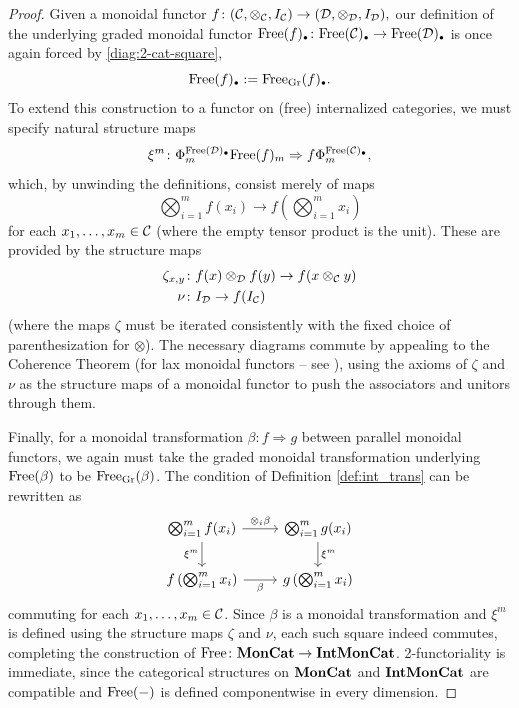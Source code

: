 \documentclass[openany, amssymb, psamsfonts]{amsart}
\theoremstyle{definition}
\numberwithin{equation}{section}
\begin{document}
\begin{proof}
Given a monoidal functor $f \colon (\mathcal{C}, \otimes_{\mathcal{C}}, I_{\mathcal{C}}) \to (\mathcal{D}, \otimes_{\mathcal{D}}, I_{\mathcal{D}}),$ our definition of the underlying graded monoidal functor $\Free(f)_\sbull \colon \Free(\C)_\sbull \to \Free(\D)_\sbull$ is once again forced by \eqref{diag:2-cat-square},
\begin{equation*}
    \Free(f)_\sbull := \Free_\Gr(f)_\sbull.
\end{equation*} To extend this construction to a functor on (free) internalized categories, we must specify natural structure maps
\begin{equation*}
    \xi^m \colon \Phi^{\Free(\D)_\sbull}_m \Free(f)_m \Rightarrow f \Phi^{\Free(\C)_\sbull}_m,
\end{equation*}which, by unwinding the definitions, consist merely of maps
\begin{equation*}
    \bigotimes_{i=1}^m f(x_i) \to f\left(\bigotimes_{i=1}^m x_i\right)
\end{equation*} for each $x_1, \dots, x_m \in \mathcal{C}$ (where the empty tensor product is the unit). These are provided by the structure maps
\begin{align*}
    \zeta_{x, y} &\colon f(x) \otimes_{\mathcal{D}} f(y) \to f(x \otimes_{\mathcal{C}} y)\\
    \nu &\colon I_{\mathcal{D}} \to f(I_{\mathcal{C}})
\end{align*} (where the maps $\zeta$ must be iterated consistently with the fixed choice of parenthesization for $\otimes$). The necessary diagrams commute by appealing to the Coherence Theorem (for lax monoidal functors -- see \cite[Section XI.2]{maclane}), using the axioms of $\zeta$ and $\nu$ as the structure maps of a monoidal functor to push the associators and unitors through them.

Finally, for a monoidal transformation $\beta \colon f \Rightarrow g$ between parallel monoidal functors, we again must take the graded monoidal transformation underlying $\mathrm{Free}(\beta)$ to be $\mathrm{Free}_{\mathrm{Gr}}(\beta)$. The condition of Definition \ref{def:int_trans} can be rewritten as
\begin{equation*}
\begin{tikzcd}
    \bigotimes_{i=1}^m f(x_i) \ar[r, "\otimes_i \beta"] \ar[d, "\xi^m"'] & \bigotimes_{i=1}^m g(x_i) \ar[d, "\xi^m"]\\
    f\left(\bigotimes_{i=1}^m x_i\right) \ar[r, "\beta"'] & g\left(\bigotimes_{i=1}^m x_i\right)
\end{tikzcd}
\end{equation*}commuting for each $x_1, \dots, x_m \in \mathcal{C}$. Since $\beta$ is a monoidal transformation and $\xi^m$ is defined using the structure maps $\zeta$ and $\nu$, each such square indeed commutes, completing the construction of $\mathrm{Free} \colon \textbf{\textup{MonCat}} \to \textbf{\textup{IntMonCat}}$. 2-functoriality is immediate, since the categorical structures on $\textbf{\textup{MonCat}}$ and $\textbf{\textup{IntMonCat}}$ are compatible and $\mathrm{Free}(-)$ is defined componentwise in every dimension.


\end{proof}
\end{document}
